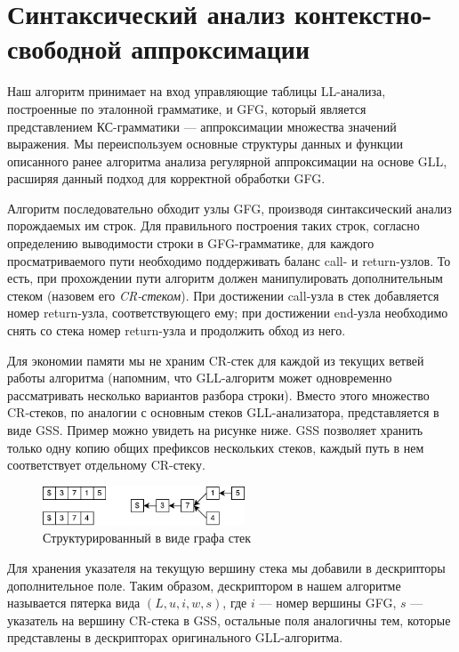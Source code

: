 \section{Синтаксический анализ контекстно-свободной аппроксимации}

Наш алгоритм принимает на вход управляющие таблицы LL-анализа, построенные по эталонной грамматике, и GFG, который является представлением КС-грамматики --- аппроксимации множества значений выражения. 
Мы переиспользуем основные структуры данных и функции описанного ранее алгоритма анализа регулярной аппроксимации на основе GLL, расширяя данный подход для корректной обработки GFG.

Алгоритм последовательно обходит узлы GFG, производя синтаксический анализ порождаемых им строк. 
Для правильного построения таких строк, согласно определению выводимости строки в GFG-грамматике, для каждого просматриваемого пути необходимо поддерживать баланс call- и return-узлов. 
То есть, при прохождении пути алгоритм должен манипулировать дополнительным стеком (назовем его \textit{CR-стеком}). 
При достижении call-узла в стек добавляется номер return-узла, соответствующего ему; при достижении end-узла необходимо снять со стека номер return-узла и продолжить обход из него. 

Для экономии памяти мы не храним CR-стек для каждой из текущих ветвей работы алгоритма (напомним, что GLL-алгоритм может одновременно рассматривать несколько вариантов разбора строки). 
Вместо этого множество CR-стеков, по аналогии с основным стеков GLL-анализатора, представляется в виде GSS. 
Пример можно увидеть на рисунке ниже. GSS позволяет хранить только одну копию общих префиксов нескольких стеков, каждый путь в нем соответствует отдельному CR-стеку.

\begin{figure}[h]
	\centering
	\includegraphics[width=6cm]{pictures/gss_cr}
	\caption{Структурированный в виде графа стек}
\end{figure}

Для хранения указателя на текущую вершину стека мы добавили в дескрипторы дополнительное поле. 
Таким образом, дескриптором в нашем алгоритме называется пятерка вида $(L, u, i, w, s)$, где $i$ --- номер вершины GFG, $s$ --- указатель на вершину CR-стека в GSS, остальные поля аналогичны тем, которые представлены в дескрипторах оригинального GLL-алгоритма.

